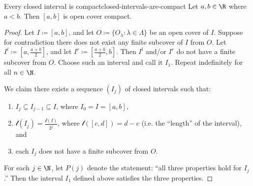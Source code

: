 \begin{thmbox}{Every closed interval is compact}{closed-intervals-are-compact}
    Let $a,b \in \R$ where $a < b$. Then $[a,b]$ is open cover compact.
    \tcblower
    \begin{proof}
        Let $I \coloneq [a,b]$, and let $O \coloneq \{O_\lambda : \lambda \in \Lambda\}$ be an open cover of $I$. Suppose for contradiction there does not exist any finite subcover of $I$ from $O$. Let $I^l \coloneq \left[ a, \frac{a+b}{2} \right]$, and let $I^r \coloneq \left[ \frac{a+b}{2}, b \right]$. Then $I^l$ and/or $I^r$ do not have a finite subcover from $O$. Choose such an interval and call it $I_1$. Repeat indefinitely for all $n \in \N$.
        \begin{notebox}
            We claim there exists a sequence $(I_j)$ of closed intervals such that:
            \begin{enumerate}
                \item $I_j \subseteq I_{j-1} \subseteq I$, where $I_0 = I = [a,b]$,
                \item $\mathscr{l}(I_j) = \frac{\mathscr{l}(I)}{2^j}$, where $\mathscr{l}([c,d]) = d - c$ (i.e. the ``length'' of the interval), and
                \item each $I_j$ does not have a finite subcover from $O$.
            \end{enumerate}
        \end{notebox}
        For each $j \in \N$, let $P(j)$ denote the statement: ``all three properties hold for $I_j$.'' Then the interval $I_1$ defined above satisfies the three properties. 


\end{proof}
\end{thmbox}
